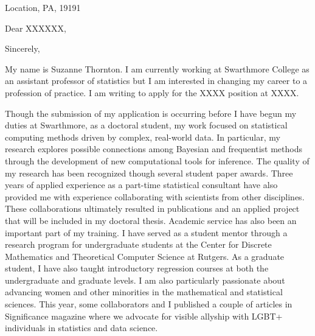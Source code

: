 \documentclass[11pt,a4paper,sans]{moderncv}
\begin{document}
	
	{Location, PA, 19191}
	\date{\today }
	\opening{Dear XXXXXX,}
	\closing{Sincerely,}
	\makelettertitle
	
	
	
	
	
	My name is Suzanne Thornton. I am currently working at Swarthmore College as an assistant professor of statistics but I am interested in changing my career to a profession of practice. I am writing to apply for the XXXX position at XXXX.\\ \vspace{.5cm}
	
	Though the submission of my application is occurring before I have begun my duties at Swarthmore, as a doctoral student, my work focused on statistical computing methods driven by complex, real-world data. In particular, my research explores possible connections among Bayesian and frequentist methods through the development of new computational tools for inference. The quality of my research has been recognized though several student paper awards. Three years of applied experience as a part-time statistical consultant have also provided me with experience collaborating with scientists from other disciplines. These collaborations ultimately resulted in publications and an applied project that will be included in my doctoral thesis. Academic service has also been an important part of my training. I have served as a student mentor through a research program for undergraduate students at the Center for Discrete Mathematics and Theoretical Computer Science at Rutgers. As a graduate student, I have also taught introductory regression courses at both the undergraduate and graduate levels. I am also particularly passionate about advancing women and other minorities in the mathematical and statistical sciences. This year, some collaborators and I published a couple of articles in Significance magazine where we advocate for visible allyship with LGBT+ individuals in statistics and data science.
	\vspace{.5cm} 
	
\end{document}
